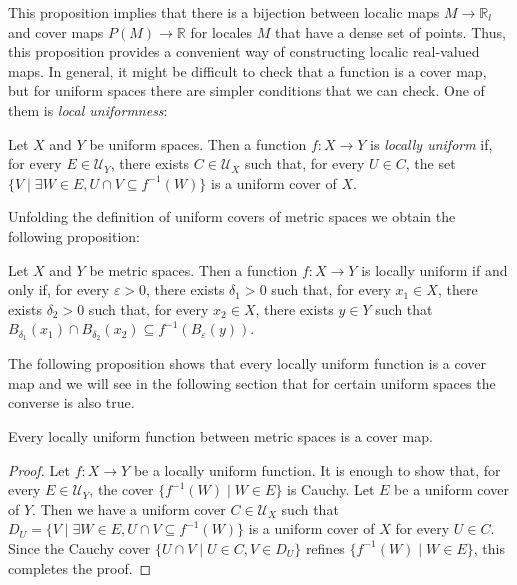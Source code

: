 \documentclass[reqno]{amsart}
\theoremstyle{definition}
\theoremstyle{remark}
\numberwithin{figure}{section}
\begin{document}
This proposition implies that there is a bijection between localic maps $M \to \mathbb{R}_l$ and cover maps $P(M) \to \mathbb{R}$ for locales $M$ that have a dense set of points.
Thus, this proposition provides a convenient way of constructing localic real-valued maps.
In general, it might be difficult to check that a function is a cover map, but for uniform spaces there are simpler conditions that we can check.
One of them is \emph{local uniformness}:

\begin{defn}
Let $X$ and $Y$ be uniform spaces.
Then a function $f : X \to Y$ is \emph{locally uniform} if, for every $E \in \mathcal{U}_Y$, there exists $C \in \mathcal{U}_X$ such that, for every $U \in C$, the set $\{ V \mid \exists W \in E, U \cap V \subseteq f^{-1}(W) \}$ is a uniform cover of $X$.
\end{defn}

Unfolding the definition of uniform covers of metric spaces we obtain the following proposition:

\begin{prop}
Let $X$ and $Y$ be metric spaces.
Then a function $f : X \to Y$ is locally uniform if and only if, for every $\varepsilon > 0$, there exists $\delta_1 > 0$ such that,
for every $x_1 \in X$, there exists $\delta_2 > 0$ such that, for every $x_2 \in X$, there exists $y \in Y$ such that $B_{\delta_1}(x_1) \cap B_{\delta_2}(x_2) \subseteq f^{-1}(B_\varepsilon(y))$.
\end{prop}

The following proposition shows that every locally uniform function is a cover map and we will see in the following section that for certain uniform spaces the converse is also true.

\begin{prop}
Every locally uniform function between metric spaces is a cover map.
\end{prop}
\begin{proof}
Let $f : X \to Y$ be a locally uniform function.
It is enough to show that, for every $E \in \mathcal{U}_Y$, the cover $\{ f^{-1}(W) \mid W \in E \}$ is Cauchy.
Let $E$ be a uniform cover of $Y$.
Then we have a uniform cover $C \in \mathcal{U}_X$ such that $D_U = \{ V \mid \exists W \in E, U \cap V \subseteq f^{-1}(W) \}$ is a uniform cover of $X$ for every $U \in C$.
Since the Cauchy cover $\{ U \cap V \mid U \in C, V \in D_U \}$ refines $\{ f^{-1}(W) \mid W \in E \}$, this completes the proof.
\end{proof}
\end{document}
